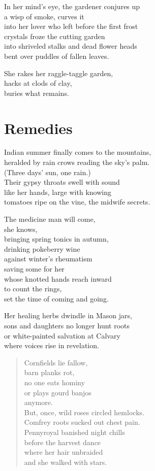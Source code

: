 \documentclass[twoside,10pt]{book}
\begin{document}
In her mind's eye, the gardener conjures up\\
a wisp of smoke, curves it\\
into her lover who left before the first frost\\
crystals froze the cutting garden\\
into shriveled stalks and dead flower heads\\
bent over puddles of fallen leaves.

She rakes her raggle-taggle garden,\\
hacks at clods of clay,\\
buries what remains.


\clearpage
\section{Remedies}

Indian summer finally comes to the mountains,\\
heralded by rain crows reading the sky's palm.\\
(Three days' sun, one rain.)\\
Their gypsy throats swell with sound\\
like her hands, large with knowing\\
tomatoes ripe on the vine, the midwife secrets.

The medicine man will come,\\
she knows,\\
bringing spring tonics in autumn,\\
drinking pokeberry wine\\
against winter's rheumatism\\
saving some for her\\
whose knotted hands reach inward\\
to count the rings,\\
set the time of coming and going.

Her healing herbs dwindle in Mason jars,\\
sons and daughters no longer hunt roots\\
or white-painted salvation at Calvary\\
where voices rise in revelation.

\begin{quote}
Cornfields lie fallow,\\
barn planks rot,\\
no one eats hominy\\
or plays gourd banjos\\
anymore.\\
But, once, wild roses circled hemlocks.\\
Comfrey roots sucked out chest pain.\\
Pennyroyal banished night chills\\
before the harvest dance\\
where her hair unbraided\\
and she walked with stars.
\end{quote}
\end{document}
